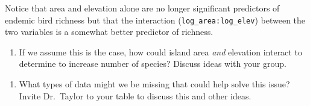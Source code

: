 \documentclass[11pt]{article}
\newcommand{\bigSpace}{\vspace{4\baselineskip}}
\begin{document}
Notice that area and elevation alone are no longer significant predictors of endemic bird richness but that the interaction (\texttt{log\_area:log\_elev}) between the two variables is a somewhat better predictor of richness.


\begin{enumerate}[resume]
\item If we assume this is the case, how could island area \emph{and} elevation interact to determine to increase number of species? Discuss ideas with your group.

\bigSpace 

\end{enumerate}


\begin{enumerate}[resume]
\item What types of data might we be missing that could help solve this issue? Invite Dr.~Taylor to your table to discuss this and other ideas.
\end{enumerate}

\newpage

\thispagestyle{empty}
\end{document}
